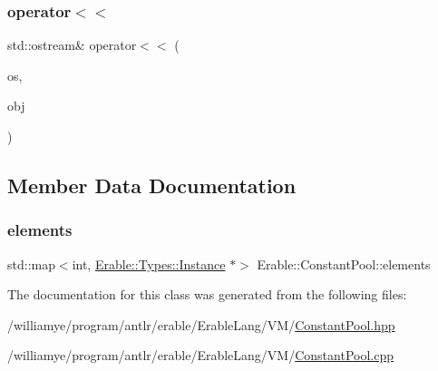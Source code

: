 \subsubsection{\texorpdfstring{operator$<$$<$}{operator<<}}
{\footnotesize\ttfamily std\+::ostream\& operator$<$$<$ (\begin{DoxyParamCaption}\item[{std\+::ostream \&}]{os,  }\item[{\mbox{\hyperlink{class_erable_1_1_constant_pool}{Constant\+Pool}} \&}]{obj }\end{DoxyParamCaption})\hspace{0.3cm}{\ttfamily [friend]}}



\subsection{Member Data Documentation}
\mbox{\label{class_erable_1_1_constant_pool_a5f02e366a42ade736b908744e1052b09}} 
\subsubsection{\texorpdfstring{elements}{elements}}
{\footnotesize\ttfamily std\+::map$<$int, \mbox{\hyperlink{class_erable_1_1_erable_1_1_types_1_1_instance}{Erable\+::\+Types\+::\+Instance}} $\ast$$>$ Erable\+::\+Constant\+Pool\+::elements\hspace{0.3cm}{\ttfamily [private]}}



The documentation for this class was generated from the following files\+:\begin{DoxyCompactItemize}
\item 
/williamye/program/antlr/erable/\+Erable\+Lang/\+V\+M/\mbox{\hyperlink{_constant_pool_8hpp}{Constant\+Pool.\+hpp}}\item 
/williamye/program/antlr/erable/\+Erable\+Lang/\+V\+M/\mbox{\hyperlink{_constant_pool_8cpp}{Constant\+Pool.\+cpp}}\end{DoxyCompactItemize}
